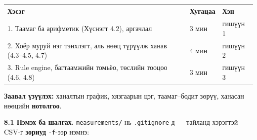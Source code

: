 \begingroup\scriptsize\begin{longtable}[]{@{}lll@{}}
\toprule
\begin{minipage}[b]{0.30\columnwidth}\raggedright
Хэсэг\strut
\end{minipage} & \begin{minipage}[b]{0.30\columnwidth}\raggedright
Хугацаа\strut
\end{minipage} & \begin{minipage}[b]{0.30\columnwidth}\raggedright
Хэн\strut
\end{minipage}\tabularnewline
\midrule
\endhead
\begin{minipage}[t]{0.30\columnwidth}\raggedright
1. Таамаг ба арифметик (Хүснэгт 4.2), аргачлал\strut
\end{minipage} & \begin{minipage}[t]{0.30\columnwidth}\raggedright
3 мин\strut
\end{minipage} & \begin{minipage}[t]{0.30\columnwidth}\raggedright
гишүүн 1\strut
\end{minipage}\tabularnewline
\begin{minipage}[t]{0.30\columnwidth}\raggedright
2. Хоёр муруй нэг тэнхлэгт, аль нөөц түрүүлж ханав (4.3--4.5, 4.7)\strut
\end{minipage} & \begin{minipage}[t]{0.30\columnwidth}\raggedright
4 мин\strut
\end{minipage} & \begin{minipage}[t]{0.30\columnwidth}\raggedright
гишүүн 2\strut
\end{minipage}\tabularnewline
\begin{minipage}[t]{0.30\columnwidth}\raggedright
3. Rule engine, багтаамжийн томьёо, төслийн тооцоо (4.6, 4.8)\strut
\end{minipage} & \begin{minipage}[t]{0.30\columnwidth}\raggedright
3 мин\strut
\end{minipage} & \begin{minipage}[t]{0.30\columnwidth}\raggedright
гишүүн 3\strut
\end{minipage}\tabularnewline
\bottomrule
\end{longtable}\endgroup

\textbf{Заавал үзүүлэх:} ханалтын график, хязгаарын цэг, таамаг--бодит зөрүү, ханасан нөөцийн \textbf{нотолгоо}.

\textbf{8.1 Нэмэх ба шалгах.} \texttt{measurements/} нь \texttt{.gitignore}-д --- тайланд хэрэгтэй CSV-г \textbf{зориуд} \texttt{-f}-ээр нэмнэ:

